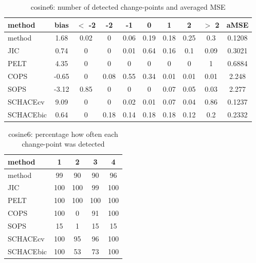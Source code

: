 \begin{table}[ht]
\centering
\begin{tabular}{l|c|ccccccc|c}
  \hline
method & bias & $<$ -2 & -2 & -1 & 0 & 1 & 2 & $>$ 2 & aMSE \\ 
  \hline
method &  1.68 &  0.02 &     0 &  0.06 &  0.19 &  0.18 &  0.25 &   0.3 & 0.1208 \\ 
  JIC &  0.74 &     0 &     0 &  0.01 &  0.64 &  0.16 &   0.1 &  0.09 & 0.3021 \\ 
  PELT &  4.35 &     0 &     0 &     0 &     0 &     0 &     0 &     1 & 0.6884 \\ 
  COPS & -0.65 &     0 &  0.08 &  0.55 &  0.34 &  0.01 &  0.01 &  0.01 & 2.248 \\ 
  SOPS & -3.12 &  0.85 &     0 &     0 &     0 &  0.07 &  0.05 &  0.03 & 2.277 \\ 
  SCHACEcv &  9.09 &     0 &     0 &  0.02 &  0.01 &  0.07 &  0.04 &  0.86 & 0.1237 \\ 
  SCHACEbic &  0.64 &     0 &  0.18 &  0.14 &  0.18 &  0.18 &  0.12 &   0.2 & 0.2332 \\ 
   \hline
\end{tabular}
\caption{cosine6: number of detected change-points and averaged MSE} 
\label{tab:cosine6Njumps}
\end{table}
\begin{table}[ht]
\centering
\begin{tabular}{l|cccc}
  \hline
method & 1 & 2 & 3 & 4 \\ 
  \hline
method &     99 &     90 &     90 &     96 \\ 
  JIC &    100 &    100 &     99 &    100 \\ 
  PELT &    100 &    100 &    100 &    100 \\ 
  COPS &    100 &      0 &     91 &    100 \\ 
  SOPS &     15 &      1 &     15 &     15 \\ 
  SCHACEcv &    100 &     95 &     96 &    100 \\ 
  SCHACEbic &    100 &     53 &     73 &    100 \\ 
   \hline
\end{tabular}
\caption{cosine6: percentage how often each change-point was detected} 
\label{tab:cosine6Detections}
\end{table}
